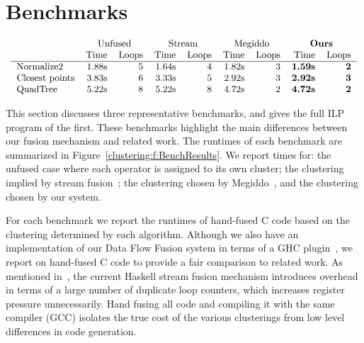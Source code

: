 \chapter{Benchmarks}
\label{clustering:s:Benchmarks}

\begin{figure*}
$$\begin{array}{c}

\begin{tabular}{lrrrrrrrr}
                & \multicolumn{2}{c}{Unfused}         & \multicolumn{2}{c}{Stream}
                & \multicolumn{2}{c}{Megiddo} &\multicolumn{2}{c}{\textbf{Ours}} \\
                & Time & Loops   & Time & Loops      & Time & Loops & Time & Loops   \\
\hline
Normalize2      & 1.88s & 5      & 1.64s & 4          & 1.82s & 3  & \textbf{1.59s} & \textbf{2}\\
Closest points  & 3.83s & 6      & 3.33s & 5          & 2.92s & 3  & \textbf{2.92s} & \textbf{3}\\
QuadTree        & 5.22s & 8      & 5.22s & 8          & 4.72s & 2  & \textbf{4.72s} & \textbf{2}\\
\end{tabular}

\end{array}$$
\caption{Benchmark results}
\label{clustering:f:BenchResults}
\end{figure*}

This section discusses three representative benchmarks, and gives the full ILP program of the first. These benchmarks highlight the main differences between our fusion mechanism and related work. The runtimes of each benchmark are summarized in Figure~\ref{clustering:f:BenchResults}. We report times for: the unfused case where each operator is assigned to its own cluster; the clustering implied by stream fusion~\cite{coutts2007stream}; the clustering chosen by Megiddo~\cite{megiddo1998optimal}, and the clustering chosen by our system. 

For each benchmark we report the runtimes of hand-fused C code based on the clustering determined by each algorithm. Although we also have an implementation of our Data Flow Fusion system in terms of a GHC plugin~\cite{lippmeier2013data}, we report on hand-fused C code to provide a fair comparison to related work. As mentioned in~\cite{lippmeier2013data}, the current Haskell stream fusion mechanism introduces overhead in terms of a large number of duplicate loop counters, which increases register pressure unnecessarily. Hand fusing all code and compiling it with the same compiler (GCC) isolates the true cost of the various clusterings from low level differences in code generation.

